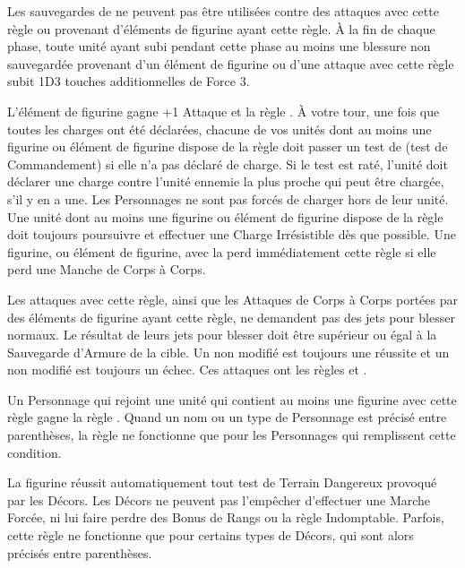 
Les sauvegardes de \regeneration{} ne peuvent pas être utilisées contre des attaques avec cette règle ou provenant d'éléments de figurine ayant cette règle. À la fin de chaque phase, toute unité ayant subi pendant cette phase au moins une blessure non sauvegardée provenant d'un élément de figurine ou d'une attaque avec cette règle subit 1D3 touches additionnelles de Force 3.


L'élément de figurine gagne +1 Attaque et la règle \immunetopsychology{}. À votre tour, une fois que toutes les charges ont été déclarées, chacune de vos unités dont au moins une figurine ou élément de figurine dispose de la règle \frenzy{} doit passer un test de \frenzy{} (test de Commandement) si elle n'a pas déclaré de charge. Si le test est raté, l'unité doit déclarer une charge contre l'unité ennemie la plus proche qui peut être chargée, s'il y en a une. Les Personnages ne sont pas forcés de charger hors de leur unité. Une unité dont au moins une figurine ou élément de figurine dispose de la règle \frenzy{} doit toujours poursuivre et effectuer une Charge Irrésistible dès que possible. Une figurine, ou élément de figurine, avec la \frenzy{} perd immédiatement cette règle si elle perd une Manche de Corps à Corps.


Les attaques avec cette règle, ainsi que les Attaques de Corps à Corps portées par des éléments de figurine ayant cette règle, ne demandent pas des jets pour blesser normaux. Le résultat de leurs jets pour blesser doit être supérieur ou égal à la Sauvegarde d'Armure de la cible. Un  non modifié est toujours une réussite et un  non modifié est toujours un échec. Ces attaques ont les règles \flamingattacks{} et .


Un Personnage qui rejoint une unité qui contient au moins une figurine avec cette règle gagne la règle \stubborn{}. Quand un nom ou un type de Personnage est précisé entre parenthèses, la règle ne fonctionne que pour les Personnages qui remplissent cette condition.


La figurine réussit automatiquement tout test de Terrain Dangereux provoqué par les Décors. Les Décors ne peuvent pas l'empêcher d'effectuer une Marche Forcée, ni lui faire perdre des Bonus de Rangs ou la règle Indomptable. Parfois, cette règle ne fonctionne que pour certains types de Décors, qui sont alors précisés entre parenthèses.


